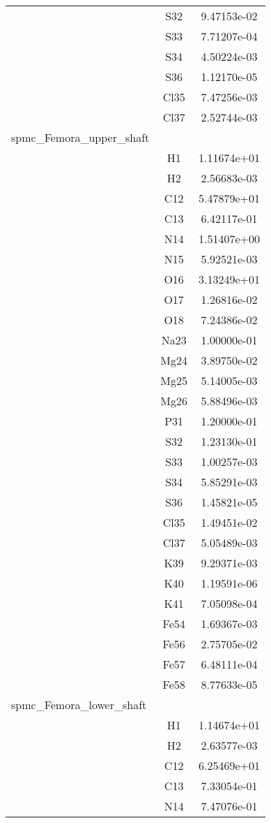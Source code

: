 \begin{centering}
\begin{longtable}{l c c}
& S32 & 9.47153e-02 \\ 
& S33 & 7.71207e-04 \\ 
& S34 & 4.50224e-03 \\ 
& S36 & 1.12170e-05 \\ 
& Cl35 & 7.47256e-03 \\ 
& Cl37 & 2.52744e-03 \\ 
\hline
spmc_Femora_upper_shaft & & \\
\hline
& H1 & 1.11674e+01 \\ 
& H2 & 2.56683e-03 \\ 
& C12 & 5.47879e+01 \\ 
& C13 & 6.42117e-01 \\ 
& N14 & 1.51407e+00 \\ 
& N15 & 5.92521e-03 \\ 
& O16 & 3.13249e+01 \\ 
& O17 & 1.26816e-02 \\ 
& O18 & 7.24386e-02 \\ 
& Na23 & 1.00000e-01 \\ 
& Mg24 & 3.89750e-02 \\ 
& Mg25 & 5.14005e-03 \\ 
& Mg26 & 5.88496e-03 \\ 
& P31 & 1.20000e-01 \\ 
& S32 & 1.23130e-01 \\ 
& S33 & 1.00257e-03 \\ 
& S34 & 5.85291e-03 \\ 
& S36 & 1.45821e-05 \\ 
& Cl35 & 1.49451e-02 \\ 
& Cl37 & 5.05489e-03 \\ 
& K39 & 9.29371e-03 \\ 
& K40 & 1.19591e-06 \\ 
& K41 & 7.05098e-04 \\ 
& Fe54 & 1.69367e-03 \\ 
& Fe56 & 2.75705e-02 \\ 
& Fe57 & 6.48111e-04 \\ 
& Fe58 & 8.77633e-05 \\ 
\hline
spmc_Femora_lower_shaft & & \\
\hline
& H1 & 1.14674e+01 \\ 
& H2 & 2.63577e-03 \\ 
& C12 & 6.25469e+01 \\ 
& C13 & 7.33054e-01 \\ 
& N14 & 7.47076e-01 \\ 

\end{longtable}
\end{centering}
